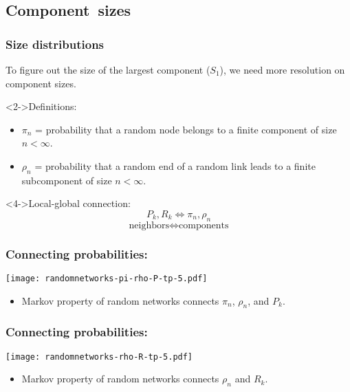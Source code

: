\subsection{Component\ sizes}

\begin{frame}[label=]
  \frametitle{Size distributions}
  
    To figure out the \alert{size of the largest component}
    ($S_1$), we need
    more resolution on component sizes.

    \begin{block}<2->{Definitions:}
      \begin{itemize}
      \item<2-> 
        \alert{$\pi_n$} = probability that a random node
        belongs to a finite component of size $n < \infty$.
      \item<3-> 
        \alert{$\rho_n$} = probability 
        that a random end of a random link leads to 
        a finite subcomponent of size $n < \infty$.
      \end{itemize}
    \end{block}
    \begin{block}<4->{Local-global connection:}
      \alert{
        $$
        P_k, R_k \Leftrightarrow \pi_n, \rho_n
        $$
        $$
        \mbox{neighbors}
        \Leftrightarrow
        \mbox{components}
        $$
      }
    \end{block}
  
\end{frame}

\begin{frame}[label=]
  \frametitle{Connecting probabilities:}

  \texttt{[image: randomnetworks-pi-rho-P-tp-5.pdf]}

  \begin{itemize}
  \item 
    Markov property of random networks connects 
    $\pi_n$, $\rho_n$, and $P_k$.
  \end{itemize}

\end{frame}

\begin{frame}[label=]
  \frametitle{Connecting probabilities:}

  \texttt{[image: randomnetworks-rho-R-tp-5.pdf]}

  \begin{itemize}
  \item 
    Markov property of random networks connects $\rho_n$ and $R_k$.
  \end{itemize}

\end{frame}

